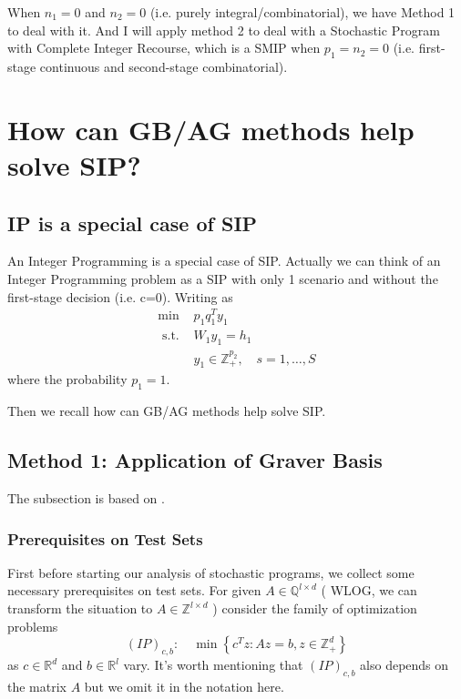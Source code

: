 \documentclass{article}
\theoremstyle{plain}
\theoremstyle{definition}
\begin{document}
When $n_1=0$ and $n_2=0$ (i.e. purely integral/combinatorial),  we have Method 1 to deal with it. And I will apply method 2 to deal with a Stochastic Program with Complete Integer Recourse, which is a SMIP when $p_1=n_2=0$ (i.e. first-stage continuous and second-stage combinatorial).

\section{How can GB/AG methods help solve SIP?}
\subsection{IP is a special case of SIP}
An Integer Programming is a special case of SIP. Actually we can think of an Integer Programming problem as a SIP with only 1 scenario and without the first-stage decision (i.e. c=0).  Writing as 
\begin{equation}
\begin{array}{ll}
\min &  p_{1} q_{1}^{T} y_{1} \\
\text { s.t. } 
& W_{1} y_{1}=h_{1} \\
& y_{1} \in \mathbb{Z}_{+}^{p_{2}}, \quad s=1, \ldots, S
\end{array}
\end{equation}
where the probability $p_1=1$.

Then we recall how can GB/AG methods help solve SIP. 

\subsection{Method 1: Application of Graver Basis}
The subsection is based on \cite{ref4}.
\subsubsection{Prerequisites on Test Sets}
First before starting our analysis of stochastic programs, we collect some necessary prerequisites on test sets. For given  $A \in \mathbb{Q}^{l \times d}$ ( WLOG, we can transform the situation to  $A \in \mathbb{Z}^{l \times d}$ )  consider the family of optimization problems
$$(I P)_{c, b}: \quad \min \left\{c^{T} z: A z=b, z \in \mathbb{Z}_{+}^{d}\right\}$$
as  $c \in \mathbb{R}^{d}$  and $ b \in \mathbb{R}^{l}$  vary. It's worth mentioning that $(IP)_{c,b}$ also depends on the matrix $A$ but we omit it in the notation here.
\end{document}
